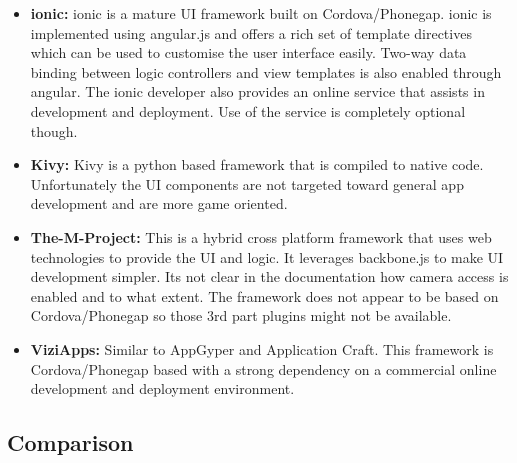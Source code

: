 \begin{itemize}[label={}]
\item \textbf{ionic:} ionic is a mature UI framework built on Cordova/Phonegap. ionic is implemented using angular.js and offers a rich set of template directives which can be used to customise the user interface easily. Two-way data binding between logic controllers and view templates is also enabled through angular. The ionic developer also provides an online service that assists in development and deployment. Use of the service is completely optional though.

\item \textbf{Kivy:} Kivy is a python based framework that is compiled to native code. Unfortunately the UI components are not targeted toward general app development and are more game oriented.

\item \textbf{The-M-Project:} This is a hybrid cross platform framework that uses web technologies to provide the UI and logic. It leverages backbone.js to make UI development simpler. Its not clear in the documentation how camera access is enabled and to what extent. The framework does not appear to be based on Cordova/Phonegap so those 3rd part plugins might not be available.

\item \textbf{ViziApps:} Similar to AppGyper and Application Craft. This framework is Cordova/Phonegap based with a strong dependency on a commercial online development and deployment environment.

\end{itemize}

\subsection{Comparison}

